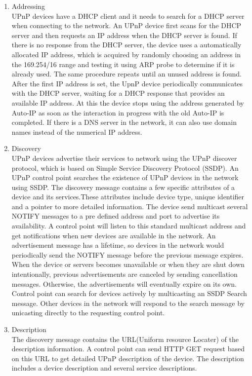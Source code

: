 \begin{enumerate} 
\item Addressing \\ 
UPnP devices have a DHCP client and it needs to search for a DHCP server when connecting to the network. An UPnP device first scans for the DHCP server and then requests an IP address when the DHCP server is found. If there is no response from the DHCP server, the device uses a automatically allocated IP address, which is acquired by randomly choosing an address in the 169.254/16 range and testing it using ARP probe to determine if it is already used. The same procedure repeats until an unused address is found. After the first IP address is set, the UpnP device periodically communicates with the DHCP server, waiting for a DHCP response that provides an available IP address. At this the device stops using the address generated by Auto-IP as soon as the interaction in progress with the old Auto-IP is completed. If there is a DNS server in the network, it can also use domain names instead of the numerical IP address. 
\item Discovery \\ 
UPnP devices advertise their services to network using the UPnP discover protocol, which is based on 
Simple Service Discovery Protocol (SSDP). An UPnP control point searches the existence of 
UPnP devices in the network using SSDP. The discovery message contains a few specific attributes 
of a device and its services.These attributes include device type, unique identifier and a 
pointer to more detailed information. 
The device send multicast several NOTIFY messages to a pre defined address and port to advertise 
its availability. A control point will listen to this standard multicast address and get 
notifications when new devices are available in the network. 
An advertisement message has a lifetime, so devices in the network would periodically send 
the NOTIFY message before the previous message expires. When the device or servers becomes unavailable or when they are shut down intentionally, previous advertisements are canceled by sending cancellation messages. Otherwise, the advertisements will eventually expire on its own. 
Control point can search for devices actively by multicasting an SSDP Search message. Other devices 
in the network will respond to the search message by unicasting directly to the requesting control point. 
\item Description \\ 
The discovery message contains the URL(Uniform resource Locater) of the description information. A control point can send HTTP GET request based on this URL to get detailed UPnP description of the device. The description includes a device description and several service descriptions. 


\end{enumerate}
